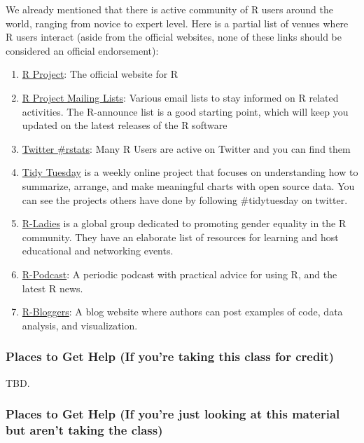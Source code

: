 \documentclass[
]{article}
\providecommand{\tightlist}{%
  \setlength{\itemsep}{0pt}\setlength{\parskip}{0pt}}
\begin{document}
We already mentioned that there is active community of R users around the world, ranging from novice to expert level.
Here is a partial list of venues where R users interact (aside from the official websites, none of these links should be considered an official endorsement):

\begin{enumerate}
\def\labelenumi{\arabic{enumi}.}
\tightlist
\item
  \href{r-project.org}{R Project}: The official website for R
\item
  \href{https://www.r-project.org/mail.html}{R Project Mailing Lists}: Various email lists to stay informed on R related activities. The R-announce list is a good starting point, which will keep you updated on the latest releases of the R software
\item
  \href{https://twitter.com/hashtag/rstats?lang=en}{Twitter \#rstats}: Many R Users are active on Twitter and you can find them
\item
  \href{https://github.com/rfordatascience/tidytuesday}{Tidy Tuesday} is a weekly online project that focuses on understanding how to summarize, arrange, and make meaningful charts with open source data. You can see the projects others have done by following \#tidytuesday on twitter.
\item
  \href{https://rladies.org/}{R-Ladies} is a global group dedicated to promoting gender equality in the R community. They have an elaborate list of resources for learning and host educational and networking events.
\item
  \href{https://r-podcast.org/}{R-Podcast}: A periodic podcast with practical advice for using R, and the latest R news.
\item
  \href{r-bloggers.com}{R-Bloggers}: A blog website where authors can post examples of code, data analysis, and visualization.
\end{enumerate}

\hypertarget{places-to-get-help-if-youre-taking-this-class-for-credit}{%
\subsubsection{Places to Get Help (If you're taking this class for credit)}\label{places-to-get-help-if-youre-taking-this-class-for-credit}}

TBD.

\hypertarget{places-to-get-help-if-youre-just-looking-at-this-material-but-arent-taking-the-class}{%
\subsubsection{Places to Get Help (If you're just looking at this material but aren't taking the class)}\label{places-to-get-help-if-youre-just-looking-at-this-material-but-arent-taking-the-class}}
\end{document}
